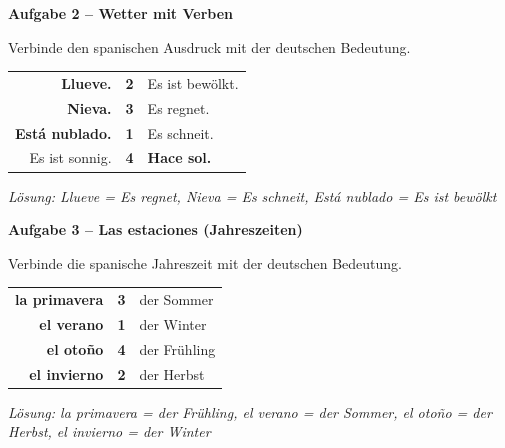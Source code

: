 \documentclass[11pt, a4paper]{article}
\newcommand{\fachfarbe}{spanisch}
\newcommand{\punktebox}[1]{\hfill\fbox{\small \_/#1}}
\newcommand{\lsg}[1]{\textcolor{loesung}{\textbf{#1}}}
\newenvironment{aufgabe}[1]{%
    \needspace{5\baselineskip}%
    \nopagebreak[4]%
    \vspace{10pt}
    \noindent\textbf{\textcolor{\fachfarbe}{Aufgabe #1}}
    \nopagebreak[4]%
    \vspace{5pt}
    \nopagebreak[4]%
    \begin{list}{}{\leftmargin=0pt}
    \item[]
}{%
    \end{list}
}
\newcommand{\es}[1]{\textcolor{\fachfarbe}{\textbf{#1}}}
\begin{document}
\vspace{15pt}


\begin{aufgabe}{2 -- Wetter mit Verben}
Verbinde den spanischen Ausdruck mit der deutschen Bedeutung. \punktebox{4}
\end{aufgabe}

\begin{center}
\begin{tabular}{rcl}
\es{Llueve.} & \lsg{2} & Es ist bewölkt. \\[0.8em]
\es{Nieva.} & \lsg{3} & Es regnet. \\[0.8em]
\es{Está nublado.} & \lsg{1} & Es schneit. \\[0.8em]
Es ist sonnig. & \lsg{4} & \es{Hace sol.} \\
\end{tabular}
\end{center}

\textit{Lösung: Llueve = Es regnet, Nieva = Es schneit, Está nublado = Es ist bewölkt}

\vspace{15pt}


\begin{aufgabe}{3 -- Las estaciones (Jahreszeiten)}
Verbinde die spanische Jahreszeit mit der deutschen Bedeutung. \punktebox{4}
\end{aufgabe}

\begin{center}
\begin{tabular}{rcl}
\es{la primavera} & \lsg{3} & der Sommer \\[0.8em]
\es{el verano} & \lsg{1} & der Winter \\[0.8em]
\es{el otoño} & \lsg{4} & der Frühling \\[0.8em]
\es{el invierno} & \lsg{2} & der Herbst \\
\end{tabular}
\end{center}

\textit{Lösung: la primavera = der Frühling, el verano = der Sommer, el otoño = der Herbst, el invierno = der Winter}
\end{document}
